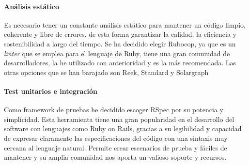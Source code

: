 \paragraph*{Análisis estático}
Es necesario tener un constante análisis estático para mantener un código limpio, coherente y libre de errores, de esta forma garantizar la calidad, la eficiencia y sostenibilidad a largo
del tiempo. Se ha decidido elegir Rubocop, ya que es un \textit{linter} que se emplea para el lenguaje de Ruby, tiene una gran comunidad de desarrolladores, la he utilizado con anterioridad
y es la más recomendada. Las otras opciones que se han barajado son Reek, Standard y Solargraph

\paragraph*{Test unitarios e integración}
Como framework de pruebas he decidido escoger RSpec por su potencia y simplicidad. Esta herramienta tiene una gran popularidad en el desarrollo
del software con lenguajes como Ruby on Rails, gracias a su legibilidad y capacidad de expresar claramente las especificaciones del código con una sintaxis
muy cercana al lenguaje natural. Permite crear escenarios de prueba y fáciles de mantener y su amplia comunidad nos aporta un valioso soporte y recursos.


